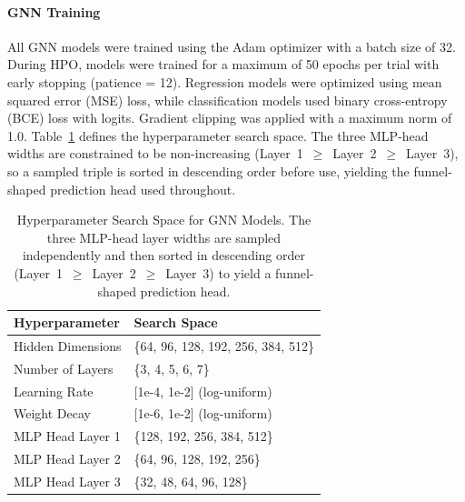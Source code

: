\documentclass[journal]{IEEEtran}
\begin{document}
\paragraph{GNN Training}
All GNN models were trained using the Adam optimizer with a batch size of 32. During HPO, models were trained for a maximum of 50 epochs per trial with early stopping (patience = 12). Regression models were optimized using mean squared error (MSE) loss, while classification models used binary cross-entropy (BCE) loss with logits. Gradient clipping was applied with a maximum norm of 1.0. Table~\ref{tab:search_space} defines the hyperparameter search space. The three MLP-head widths are constrained to be non-increasing (Layer~1~$\geq$~Layer~2~$\geq$~Layer~3), so a sampled triple is sorted in descending order before use, yielding the funnel-shaped prediction head used throughout.

\begin{table}[!t]
\centering
\caption{Hyperparameter Search Space for GNN Models. The three MLP-head layer widths are sampled independently and then sorted in descending order (Layer~1~$\geq$~Layer~2~$\geq$~Layer~3) to yield a funnel-shaped prediction head.}
\label{tab:search_space}
\small
\begin{tabular}{ll}
\toprule
\textbf{Hyperparameter} & \textbf{Search Space} \\
\midrule
Hidden Dimensions & \{64, 96, 128, 192, 256, 384, 512\} \\
Number of Layers & \{3, 4, 5, 6, 7\} \\
Learning Rate & [1e-4, 1e-2] (log-uniform) \\
Weight Decay & [1e-6, 1e-2] (log-uniform) \\
MLP Head Layer 1 & \{128, 192, 256, 384, 512\} \\
MLP Head Layer 2 & \{64, 96, 128, 192, 256\} \\
MLP Head Layer 3 & \{32, 48, 64, 96, 128\} \\
\bottomrule
\end{tabular}
\end{table}
\end{document}
